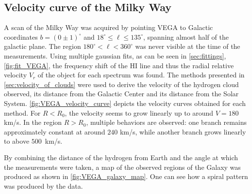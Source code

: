 \subsection{Velocity curve of the Milky Way}
A scan of the Milky Way was acquired by pointing VEGA to Galactic coordinates $b = (0\pm 1)^\circ$ and $18^\circ \leq \ell \leq 135^\circ$, spanning almost half of the galactic plane. The region $180^\circ < \ell < 360^\circ$ was never visible at the time of the measurements.
Using multiple gaussian fits, as can be seen in \autoref{sec:fittings}, \autoref{fig:fit_VEGA}, the frequency shift of the HI line and thus the radial relative velocity $V_r$ of the object for each spectrum was found. The methods presented in \autoref{sec:velocity_of_clouds} were used to derive the velocity of the hydrogen cloud observed, its distance from the Galactic Center and its distance from the Solar System.
\autoref{fig:VEGA_velocity_curve} depicts the velocity curves obtained for each method. For $R < R_0$, the velocity seems to grow linearly up to around $V=180$ km/s. In the region $R > R_0$, multiple behaviors are observed: one branch remains approximately constant at around $240$ km/s, while another branch grows linearly to above \mbox{$500$ km/s.}

By combining the distance of the hydrogen from Earth and the angle at which the measurements were taken, a map of the observed regions of the Galaxy was produced as shown in \autoref{fig:VEGA_galaxy_map}. One can see how a spiral pattern was produced by the data.


